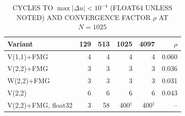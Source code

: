 \begin{table}[t]
\centering
\caption{CYCLES TO $\max |\Delta u| < 10^{-4}$ (FLOAT64 UNLESS NOTED) AND CONVERGENCE FACTOR $\rho$ AT $N = 1025$}
\label{tab:gmg_cycles}
\begin{tabular}{lrrrrr}
\hline
Variant & 129 & 513 & 1025 & 4097 & $\rho$ \\
\hline
V(1,1)+FMG           & 4 & 4 & 4   & 4   & 0.060 \\
V(2,2)+FMG           & 3 & 3 & 3   & 3   & 0.036 \\
W(2,2)+FMG           & 3 & 3 & 3   & 3   & 0.031 \\
V(2,2)               & 6 & 6 & 6   & 6   & 0.043 \\
V(2,2)+FMG, float32  & 3 & 58 & 400$^\dagger$ & 400$^\dagger$ & -- \\
\hline
\end{tabular}
\end{table}
